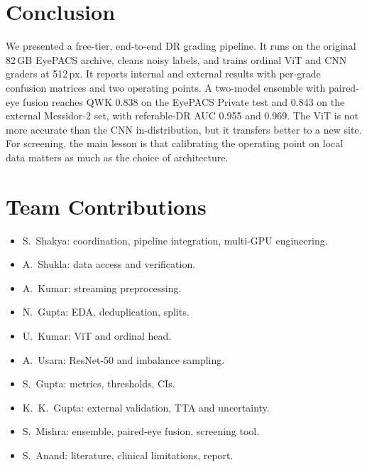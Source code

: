 \documentclass[conference,a4paper]{IEEEtran}
\begin{document}
\section{Conclusion}
We presented a free-tier, end-to-end DR grading pipeline. It runs on the original 82\,GB EyePACS archive, cleans noisy labels, and trains ordinal ViT and CNN graders at 512\,px.
It reports internal and external results with per-grade confusion matrices and two operating points.
A two-model ensemble with paired-eye fusion reaches QWK 0.838 on the EyePACS Private test and 0.843 on the external Messidor-2 set, with referable-DR AUC 0.955 and 0.969.
The ViT is not more accurate than the CNN in-distribution, but it transfers better to a new site.
For screening, the main lesson is that calibrating the operating point on local data matters as much as the choice of architecture.

\section*{Team Contributions}
\begin{itemize}
\item S.~Shakya: coordination, pipeline integration, multi-GPU engineering.
\item A.~Shukla: data access and verification.
\item A.~Kumar: streaming preprocessing.
\item N.~Gupta: EDA, deduplication, splits.
\item U.~Kumar: ViT and ordinal head.
\item A.~Usara: ResNet-50 and imbalance sampling.
\item S.~Gupta: metrics, thresholds, CIs.
\item K.~K.~Gupta: external validation, TTA and uncertainty.
\item S.~Mishra: ensemble, paired-eye fusion, screening tool.
\item S.~Anand: literature, clinical limitations, report.
\end{itemize}
\end{document}
